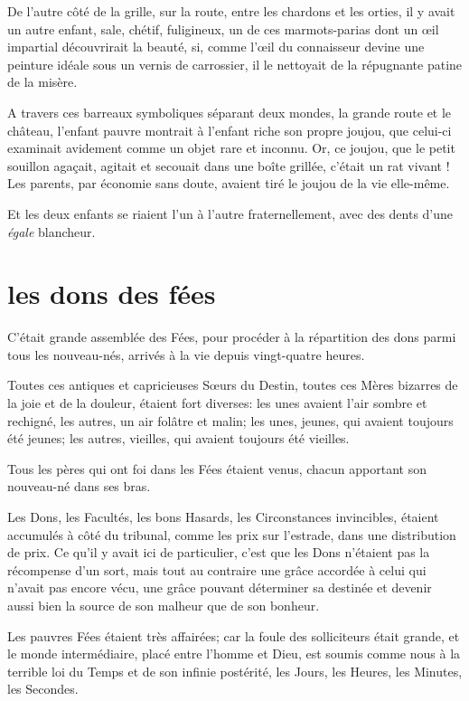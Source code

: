 De l’autre côté de la grille, sur la route, entre les
chardons et les orties, il y avait un autre enfant, sale, chétif,
fuligineux, un de ces marmots{}-parias dont un \oe il impartial
découvrirait la beauté, si, comme l’\oe il du
connaisseur devine une peinture idéale sous un vernis de carrossier, il
le nettoyait de la répugnante patine de la misère.

A travers ces barreaux symboliques séparant deux mondes, la grande route
et le château, l’enfant pauvre montrait à
l’enfant riche son propre joujou, que celui{}-ci
examinait avidement comme un objet rare et inconnu. Or, ce joujou, que
le petit souillon agaçait, agitait et secouait dans une boîte grillée,
c’était un rat vivant ! Les parents, par économie sans
doute, avaient tiré le joujou de la vie elle{}-même.

Et les deux enfants se riaient l’un à
l’autre fraternellement, avec des dents
d’une \textit{égale} blancheur.

\quebra\section[Les dons des fées]{les dons des fées}

C’était grande assemblée des Fées, pour procéder à la
répartition des dons parmi tous les nouveau{}-nés, arrivés à la vie
depuis vingt{}-quatre heures.

Toutes ces antiques et capricieuses S\oe urs du Destin, toutes ces Mères
bizarres de la joie et de la douleur, étaient fort diverses: les unes
avaient l’air sombre et rechigné, les autres, un air
folâtre et malin; les unes, jeunes, qui avaient toujours été jeunes;
les autres, vieilles, qui avaient toujours été vieilles.

Tous les pères qui ont foi dans les Fées étaient venus, chacun apportant
son nouveau{}-né dans ses bras.

Les Dons, les Facultés, les bons Hasards, les Circonstances invincibles,
étaient accumulés à côté du tribunal, comme les prix sur
l’estrade, dans une distribution de prix. Ce
qu’il y avait ici de particulier,
c’est que les Dons n’étaient pas la
récompense d’un sort, mais tout au contraire une grâce
accordée à celui qui n’avait pas encore vécu, une
grâce pouvant déterminer sa destinée et devenir aussi bien la source de
son malheur que de son bonheur.

Les pauvres Fées étaient très affairées; car la foule des solliciteurs
était grande, et le monde intermédiaire, placé entre
l’homme et Dieu, est soumis comme nous à la terrible
loi du Temps et de son infinie postérité, les Jours, les Heures, les
Minutes, les Secondes.

